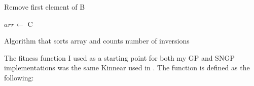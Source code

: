 \documentclass{article}
\newcommand{\assign}[2]{$#1 \leftarrow$ #2}
\begin{document}
\begin{algorithm}[H]
{{{{                            Remove first element of B
                            
                        }
                    }
                    
                    
                    \assign{arr}{C}
                    
                }
                
                
            }
            
            \caption{Algorithm that sorts array and counts number of inversions}
            
            
            
            \label{alg:countInv}
            
        \end{algorithm}
        
        The fitness function I used as a starting point for both my GP and SNGP implementations was the same Kinnear used in \cite{kinnear_evolving_1993,kinnear_generality_1993}. The function is defined as the following:
        
\end{document}
